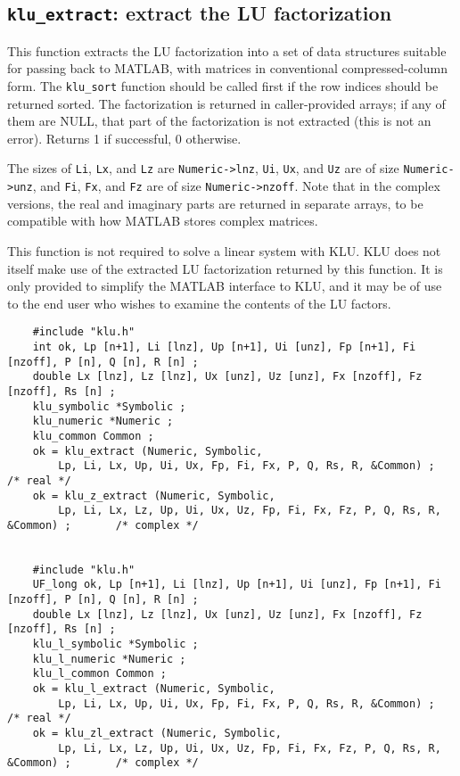 \documentclass[11pt]{article}
\begin{document}
\subsection{{\tt klu\_extract}: extract the LU factorization}

This function extracts the LU factorization into a set of data structures
suitable for passing back to MATLAB, with matrices in conventional
compressed-column form.  The {\tt klu\_sort} function should be called first if
the row indices should be returned sorted.  The factorization is returned in
caller-provided arrays; if any of them are NULL, that part of the factorization
is not extracted (this is not an error).  Returns 1 if successful, 0 otherwise.

The sizes of {\tt Li}, {\tt Lx}, and {\tt Lz} are {\tt Numeric->lnz},
{\tt Ui}, {\tt Ux}, and {\tt Uz} are of size {\tt Numeric->unz}, and
{\tt Fi}, {\tt Fx}, and {\tt Fz} are of size {\tt Numeric->nzoff}.
Note that in the complex versions, the real and imaginary parts are returned
in separate arrays, to be compatible with how MATLAB stores complex matrices.

This function is not required to solve a linear system with KLU.  KLU does not
itself make use of the extracted LU factorization returned by this function.
It is only provided to simplify the MATLAB interface to KLU, and it may be of
use to the end user who wishes to examine the contents of the LU factors.

{\footnotesize
\begin{verbatim}
    #include "klu.h"
    int ok, Lp [n+1], Li [lnz], Up [n+1], Ui [unz], Fp [n+1], Fi [nzoff], P [n], Q [n], R [n] ;
    double Lx [lnz], Lz [lnz], Ux [unz], Uz [unz], Fx [nzoff], Fz [nzoff], Rs [n] ;
    klu_symbolic *Symbolic ;
    klu_numeric *Numeric ;
    klu_common Common ;
    ok = klu_extract (Numeric, Symbolic,
        Lp, Li, Lx, Up, Ui, Ux, Fp, Fi, Fx, P, Q, Rs, R, &Common) ;                   /* real */
    ok = klu_z_extract (Numeric, Symbolic,
        Lp, Li, Lx, Lz, Up, Ui, Ux, Uz, Fp, Fi, Fx, Fz, P, Q, Rs, R, &Common) ;       /* complex */


    #include "klu.h"
    UF_long ok, Lp [n+1], Li [lnz], Up [n+1], Ui [unz], Fp [n+1], Fi [nzoff], P [n], Q [n], R [n] ;
    double Lx [lnz], Lz [lnz], Ux [unz], Uz [unz], Fx [nzoff], Fz [nzoff], Rs [n] ;
    klu_l_symbolic *Symbolic ;
    klu_l_numeric *Numeric ;
    klu_l_common Common ;
    ok = klu_l_extract (Numeric, Symbolic,
        Lp, Li, Lx, Up, Ui, Ux, Fp, Fi, Fx, P, Q, Rs, R, &Common) ;                   /* real */
    ok = klu_zl_extract (Numeric, Symbolic,
        Lp, Li, Lx, Lz, Up, Ui, Ux, Uz, Fp, Fi, Fx, Fz, P, Q, Rs, R, &Common) ;       /* complex */
\end{verbatim}
}
\end{document}
